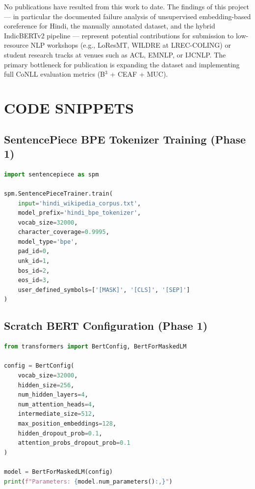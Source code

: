 \documentclass[12pt,a4paper]{report}
\begin{document}
\noindent No publications have resulted from this work to date. The findings of this project --- in particular the documented failure analysis of unsupervised embedding-based coreference for Hindi, the manually annotated dataset, and the hybrid IndicBERTv2 pipeline --- represent potential contributions for submission to low-resource NLP workshops (e.g., LoResMT, WILDRE at LREC-COLING) or student research tracks at venues such as ACL, EMNLP, or IJCNLP. The primary bottleneck for publication is expanding the dataset and implementing full CoNLL evaluation metrics (B$^3$ + CEAF + MUC).

\appendix

\chapter{CODE SNIPPETS}

\section{SentencePiece BPE Tokenizer Training (Phase 1)}

\begin{lstlisting}[language=Python, caption={SentencePiece BPE Tokenizer Training for Hindi}]
import sentencepiece as spm

spm.SentencePieceTrainer.train(
    input='hindi_wikipedia_corpus.txt',
    model_prefix='hindi_bpe_tokenizer',
    vocab_size=32000,
    character_coverage=0.9995,
    model_type='bpe',
    pad_id=0,
    unk_id=1,
    bos_id=2,
    eos_id=3,
    user_defined_symbols=['[MASK]', '[CLS]', '[SEP]']
)
\end{lstlisting}

\section{Scratch BERT Configuration (Phase 1)}

\begin{lstlisting}[language=Python, caption={Compact BERT Configuration for Scratch Training}]
from transformers import BertConfig, BertForMaskedLM

config = BertConfig(
    vocab_size=32000,
    hidden_size=256,
    num_hidden_layers=4,
    num_attention_heads=4,
    intermediate_size=512,
    max_position_embeddings=128,
    hidden_dropout_prob=0.1,
    attention_probs_dropout_prob=0.1
)

model = BertForMaskedLM(config)
print(f"Parameters: {model.num_parameters():,}")
\end{lstlisting}
\end{document}
